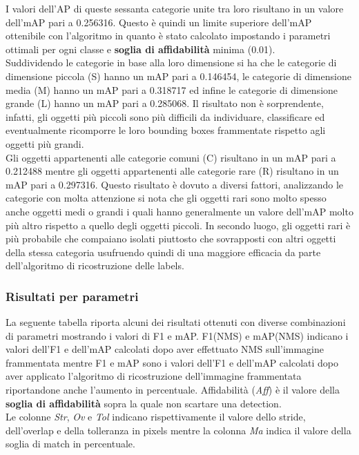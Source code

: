I valori dell'AP di queste sessanta categorie unite tra loro risultano in un valore dell'mAP pari a 0.256316. Questo è quindi un limite superiore dell'mAP ottenibile con l'algoritmo in quanto è stato calcolato impostando i parametri ottimali per ogni classe e \textbf{soglia di affidabilità} minima (0.01).\\
Suddividendo le categorie in base alla loro dimensione si ha che le categorie di dimensione piccola (S) hanno un mAP pari a 0.146454, le categorie di dimensione media (M) hanno un mAP pari a 0.318717 ed infine le categorie di dimensione grande (L) hanno un mAP pari a 0.285068. Il risultato non è sorprendente, infatti, gli oggetti più piccoli sono più difficili da individuare, classificare ed eventualmente ricomporre le loro bounding boxes frammentate rispetto agli oggetti più grandi.\\
Gli oggetti appartenenti alle categorie comuni (C) risultano in un mAP pari a 0.212488 mentre gli oggetti appartenenti alle categorie rare (R) risultano in un mAP pari a 0.297316. Questo risultato è dovuto a diversi fattori, analizzando le categorie con molta attenzione si nota che gli oggetti rari sono molto spesso anche oggetti medi o grandi i quali hanno generalmente un valore dell'mAP molto più altro rispetto a quello degli oggetti piccoli. In secondo luogo, gli oggetti rari è più probabile che compaiano isolati piuttosto che sovrapposti con altri oggetti della stessa categoria usufruendo quindi di una maggiore efficacia da parte dell'algoritmo di ricostruzione delle labels.

\clearpage
\subsubsection{Risultati per parametri}
La seguente tabella riporta alcuni dei risultati ottenuti con diverse combinazioni di parametri mostrando i valori di F1 e mAP. F1(NMS) e mAP(NMS) indicano i valori dell'F1 e dell'mAP calcolati dopo aver effettuato NMS sull'immagine frammentata mentre F1 e mAP sono i valori dell'F1 e dell'mAP calcolati dopo aver applicato l'algoritmo di ricostruzione dell'immagine frammentata riportandone anche l'aumento in percentuale. Affidabilità (\textit{Aff}) è il valore della \textbf{soglia di affidabilità} sopra la quale non scartare una detection.\\
Le colonne \textit{Str}, \textit{Ov} e \textit{Tol} indicano rispettivamente il valore dello stride, dell'overlap e della tolleranza in pixels mentre la colonna \textit{Ma} indica il valore della soglia di match in percentuale.


